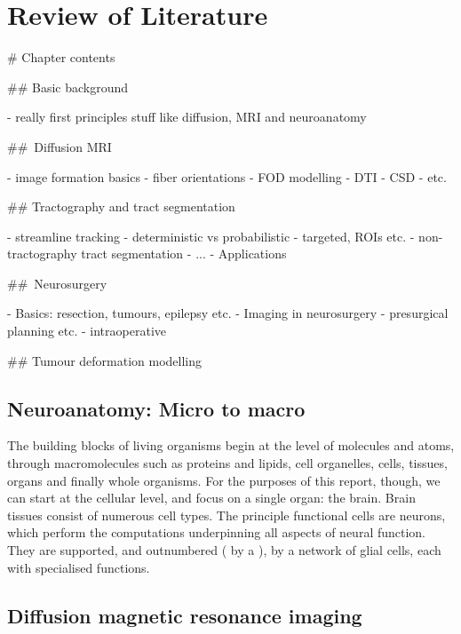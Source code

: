 \chapter{Review of Literature}
\label{chapterlabel1}

\begin{markdown}

  # Chapter contents

  ## Basic background

  - really first principles stuff like diffusion, MRI and neuroanatomy

  ## Diffusion MRI

  - image formation basics
  - fiber orientations
  - FOD modelling
    - DTI
    - CSD
    - etc.

  ## Tractography and tract segmentation

  - streamline tracking
    - deterministic vs probabilistic
    - targeted, ROIs etc.
  - non-tractography tract segmentation
    - ...
  - Applications

  ## Neurosurgery

  - Basics: resection, tumours, epilepsy etc.
  - Imaging in neurosurgery
    - presurgical planning etc.
    - intraoperative

  ## Tumour deformation modelling


\end{markdown}

\section{Neuroanatomy: Micro to macro}

The building blocks of living organisms begin at the level of molecules and atoms, through macromolecules such as proteins and lipids, cell organelles, cells, tissues, organs and finally whole organisms.
For the purposes of this report, though, we can start at the cellular level, and focus on a single organ: the brain.
Brain tissues consist of numerous cell types.
The principle functional cells are neurons, which perform the computations underpinning all aspects of neural function. They are supported, and outnumbered ( by a ), by a network of glial cells, each with specialised functions.

\section{Diffusion magnetic resonance imaging}

